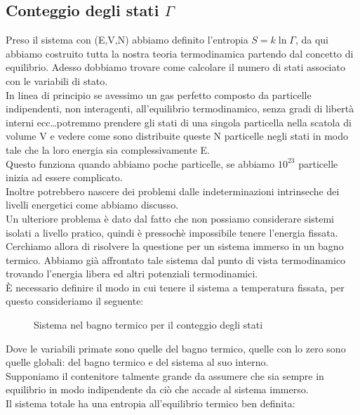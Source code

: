 \subsection{Conteggio degli stati $\Gamma$}%
Preso il sistema con (E,V,N) abbiamo definito l'entropia $S = k \ln\Gamma$, da qui abbiamo costruito tutta la nostra teoria termodinamica partendo dal concetto di equilibrio. Adesso dobbiamo trovare come calcolare il numero di stati associato con le variabili di stato.\\
In linea di principio se avessimo un gas perfetto composto da particelle indipendenti, non interagenti, all'equilibrio termodinamico, senza gradi di libertà interni ecc\ldots potremmo prendere gli stati di una singola particella nella scatola di volume V e vedere come sono distribuite queste N particelle negli stati in modo tale che la loro energia sia complessivamente E.\\
Questo funziona quando abbiamo poche particelle, se abbiamo $10^{23}$ particelle inizia ad essere complicato. \\
Inoltre potrebbero nascere dei problemi dalle indeterminazioni intrinseche dei livelli energetici come abbiamo discusso. \\
Un ulteriore problema è dato dal fatto che non possiamo considerare sistemi isolati a livello pratico, quindi è pressochè impossibile tenere l'energia fissata.\\
Cerchiamo allora di risolvere la questione per un sistema immerso in un bagno termico. Abbiamo già affrontato tale sistema dal punto di vista termodinamico trovando l'energia libera ed altri potenziali termodinamici.\\
È necessario definire il modo in cui tenere il sistema a temperatura fissata, per questo consideriamo il seguente:
\begin{figure}[H]
    \centering
    \caption{Sistema nel bagno termico per il conteggio degli stati}
    \label{fig:sistema-nel-bagno-termico-per-il-conteggio-degli-stati}
\end{figure}
\noindent
Dove le variabili primate sono quelle del bagno termico, quelle con lo zero sono quelle globali: del bagno termico e del sistema al suo interno.\\
Supponiamo il contenitore talmente grande da assumere che sia sempre in equilibrio in modo indipendente da ciò che accade al sistema immerso.\\
Il sistema totale ha una entropia all'equilibrio termico ben definita:
